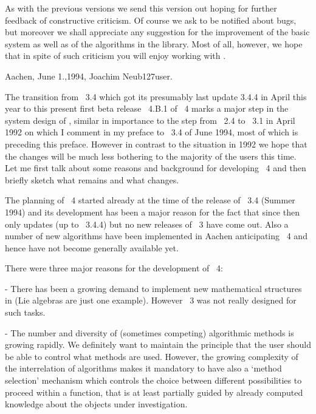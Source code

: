 As with the previous versions we send this version out hoping for further
feedback of constructive   criticism.  Of course  we ask  to be  notified
about bugs,  but moreover  we shall  appreciate   any suggestion  for the
improvement of the  basic  system as  well  as of  the algorithms  in the
library.  Most of all,  however, we hope that in  spite of such criticism
you will enjoy working with {\GAP}.

Aachen, June 1.,1994, \hfill Joachim Neub\accent127user.


The transition from {\GAP}~3.4 which got its presumably last update 3.4.4
in April  this year to this  present first beta  release {\GAP}~4.B.1  of
{\GAP}~4  marks a  major step in the system  design of {\GAP}, similar in
importance to the  step from {\GAP}~2.4 to   {\GAP}~3.1 in April 1992  on
which I comment in my preface  to {\GAP}~3.4 of  June 1994, most of which
is preceding this  preface. However in  contrast to the situation in 1992
we hope that the  changes will be much less  bothering to the majority of
the  {\GAP} users this time.   Let me first talk   about some reasons and
background  for developing {\GAP}~4  and then briefly sketch what remains
and what changes.

The  planning of {\GAP}~4 started  already at the time  of the release of
{\GAP}~3.4 (Summer 1994) and its development has been  a major reason for
the fact that  since then  only updates  (up to {\GAP}~3.4.4)  but no new
releases of {\GAP}~3 have come out. Also a number  of new algorithms have
been implemented   in  Aachen anticipating {\GAP}~4   and  hence have not
become generally available yet.

There were three major reasons for the development of {\GAP}~4:

\beginlist
  \item{-}
    There has  been a  growing   demand  to implement  new   mathematical
    structures in  {\GAP} (Lie algebras are just  one  example).  However
    {\GAP}~3 was not really designed for such tasks.

  \item{-}
    The number and diversity of (sometimes competing) algorithmic methods
    is  growing rapidly.   We  definitely want  to maintain the principle
    that the  user  should  be  able to control   what  methods are used.
    However, the growing complexity  of  the interrelation of  algorithms
    makes it mandatory to have  also a `method selection' mechanism which
    controls the choice between different possibilities to proceed within
    a  {\GAP} function,  that  is  at least  partially  guided by already
    computed knowledge about the objects under investigation.

